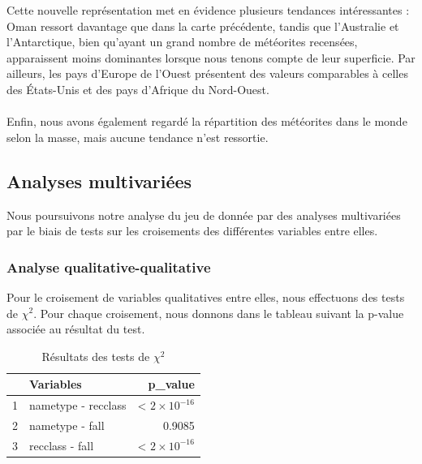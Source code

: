 \documentclass[12pt]{article}
\begin{document}
Cette nouvelle représentation met en évidence plusieurs tendances intéressantes : Oman ressort davantage que dans la carte précédente, tandis que l’Australie et l’Antarctique, bien qu’ayant un grand nombre de météorites recensées, apparaissent moins dominantes lorsque nous tenons compte de leur superficie. Par ailleurs, les pays d’Europe de l’Ouest présentent des valeurs comparables à celles des États-Unis et des pays d’Afrique du Nord-Ouest.\\
\\
Enfin, nous avons également regardé la répartition des météorites dans le monde selon la masse, mais aucune tendance n'est ressortie.

\subsection{Analyses multivariées}
Nous poursuivons notre analyse du jeu de donnée par des analyses multivariées par le biais de tests sur les croisements des différentes variables entre elles.
\subsubsection*{Analyse qualitative-qualitative}
Pour le croisement de variables qualitatives entre elles, nous effectuons des tests de $\chi^2$. Pour chaque croisement, nous donnons dans le tableau suivant la p-value associée au résultat du test.
\begin{table}[H]
\centering
\begin{tabular}{rlr}
  \hline
 & Variables & p\_value \\ 
  \hline
1 & nametype - recclass & < $2\times 10^{-16}$  \\ 
  2 & nametype - fall & 0.9085 \\ 
  3 & recclass - fall & < $2\times 10^{-16}$  \\ 
   \hline
\end{tabular}
\caption{Résultats des tests de $\chi^2$}
\end{table}
\end{document}
